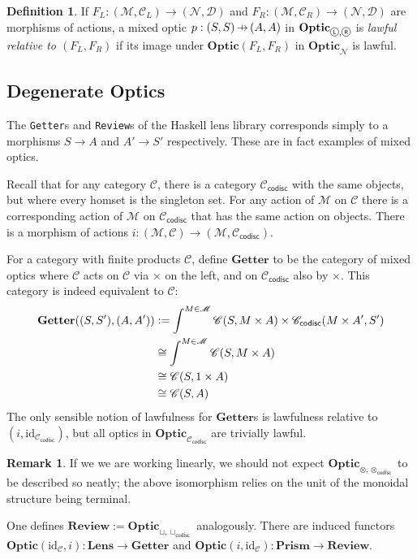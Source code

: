 \documentclass[11pt,letterpaper]{article}
\theoremstyle{plain}
\theoremstyle{definition}
\newtheorem{definition}[theorem]{Definition}
\newtheorem{remark}[theorem]{Remark}
\newcommand{\C}{\mathscr{C}}
\newcommand{\D}{\mathscr{D}}
\newcommand{\M}{\mathscr{M}}
\newcommand{\N}{\mathscr{N}}
\newcommand{\Optic}{\mathbf{Optic}}
\newcommand{\Lens}{\mathbf{Lens}}
\newcommand{\Prism}{\mathbf{Prism}}
\newcommand{\Getter}{\mathbf{Getter}}
\newcommand{\Review}{\mathbf{Review}}
\newcommand{\id}{\mathrm{id}}
\newcommand{\codisc}{\mathsf{codisc}}
\newcommand{\defeq}{\mathrel{\vcentcolon=}}
\newcommand*\circled[1]{\tikz[baseline={([yshift=-0.65ex]current bounding box.center)}]{
   \node[shape=circle,draw,inner sep=1pt] (char) {#1};}}
\newcommand{\actL}{{\circled{\tiny$\mathsf{L}$}}}
\newcommand{\actR}{{\circled{\tiny$\mathsf{R}$}}}
\newcommand{\hto}{\ensuremath{\,\mathaccent\shortmid\rightarrow\,}}
\begin{document}
\begin{definition}
If $F_L : (\M, \C_L) \to (\N, \D)$ and $F_R : (\M, \C_R) \to (\N, \D)$ are morphisms of actions, a mixed optic $p : (S, S) \hto (A, A)$ in $\Optic_{\actL, \actR}$ is \emph{lawful relative to $(F_L, F_R)$} if its image under $\Optic(F_L, F_R)$ in $\Optic_\N$ is lawful.
\end{definition}

\subsection{Degenerate Optics}
 
The \texttt{Getter}s and \texttt{Review}s of the Haskell lens library corresponds simply to a morphisms $S \to A$ and $A' \to S'$ respectively. These are in fact examples of mixed optics.

Recall that for any category $\C$, there is a category $\C_\codisc$ with the same objects, but where every homset is the singleton set. For any action of $\M$ on $\C$ there is a corresponding action of $\M$ on $\C_\codisc$ that has the same action on objects. There is a morphism of actions $i : (\M, \C) \to (\M, \C_\codisc)$.

For a category with finite products $\C$, define $\Getter$ to be the category of mixed optics where $\C$ acts on $\C$ via $\times$ on the left, and on $\C_\codisc$ also by $\times$. This category is indeed equivalent to $\C$:
\begin{align*}
\Getter((S, S'), (A, A')) 
&\defeq \int^{M \in \M} \C(S, M \times A) \times \C_\codisc(M \times A', S')\\
&\cong \int^{M \in \M} \C(S, M \times A) \\
&\cong \C(S, 1 \times A) \\
&\cong \C(S, A)
\end{align*}
The only sensible notion of lawfulness for $\Getter$s is lawfulness relative to $(i, \id_{\C_\codisc})$, but all optics in $\Optic_{\C_\codisc}$ are trivially lawful.

\begin{remark}
If we we are working linearly, we should not expect $\Optic_{\otimes, \otimes_\codisc}$ to be described so neatly; the above isomorphism relies on the unit of the monoidal structure being terminal.
\end{remark}

One defines $\Review := \Optic_{\sqcup, \sqcup_\codisc}$ analogously. There are induced functors $\Optic(\id_\C, i) : \Lens \to \Getter$ and $\Optic(i, \id_\C) : \Prism \to \Review$.
\end{document}
